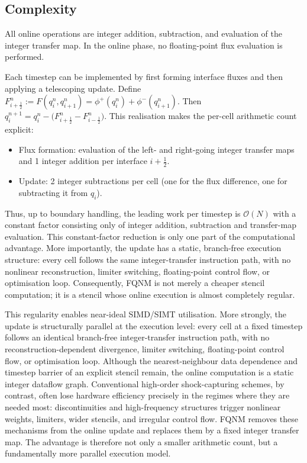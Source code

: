 \documentclass[sn-basic]{sn-jnl}
\theoremstyle{plain}
\theoremstyle{remark}
\begin{document}
\subsection{Complexity}
\label{subsec:complexity}

All online operations are integer addition, subtraction, and evaluation of the integer transfer map.
In the online phase, no floating-point flux evaluation is performed.

Each timestep can be implemented by first forming interface fluxes and then applying a telescoping update.
Define
\(
F_{i+\frac12}^n := F(q_i^n,q_{i+1}^n)=\phi^+(q_i^n)+\phi^-(q_{i+1}^n).
\)
Then
\(
q_i^{n+1}=q_i^n-\big(F_{i+\frac12}^n-F_{i-\frac12}^n\big).
\)
This realisation makes the per-cell arithmetic count explicit:
\begin{itemize}
\item Flux formation: evaluation of the left- and right-going integer transfer maps and 1 integer addition per interface \(i+\tfrac12\).
\item Update: 2 integer subtractions per cell (one for the flux difference, one for subtracting it from \(q_i\)).
\end{itemize}
Thus, up to boundary handling, the leading work per timestep is $\mathcal{O}(N)$ with a constant factor consisting only of integer addition, subtraction and transfer-map evaluation. This constant-factor reduction is only one part of the computational advantage. More importantly, the update has a static, branch-free execution structure: every cell follows the same integer-transfer instruction path, with no nonlinear reconstruction, limiter switching, floating-point control flow, or optimisation loop. Consequently, FQNM is not merely a cheaper stencil computation; it is a stencil whose online execution is almost completely regular.


This regularity enables near-ideal SIMD/SIMT utilisation. More strongly, the update is structurally parallel at the execution level: every cell at a fixed timestep follows an identical branch-free integer-transfer instruction path, with no reconstruction-dependent divergence, limiter switching, floating-point control flow, or optimisation loop. Although the nearest-neighbour data dependence and timestep barrier of an explicit stencil remain, the online computation is a static integer dataflow graph. Conventional high-order shock-capturing schemes, by contrast, often lose hardware efficiency precisely in the regimes where they are needed most: discontinuities and high-frequency structures trigger nonlinear weights, limiters, wider stencils, and irregular control flow. FQNM removes these mechanisms from the online update and replaces them by a fixed integer transfer map. The advantage is therefore not only a smaller arithmetic count, but a fundamentally more parallel execution model.
\end{document}
